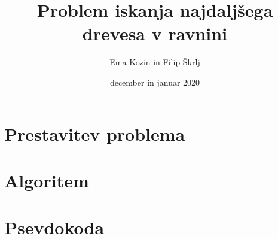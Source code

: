 \documentclass[a4paper,12pt]{article}
\title{Problem iskanja najdaljšega drevesa v ravnini}
\author{Ema Kozin in Filip Škrlj}
\date{december in januar 2020}
\begin{document}
	
\maketitle
	
\newpage
\section{Prestavitev problema}



\section{Algoritem}

\section{Psevdokoda}
	
	
\end{document}
